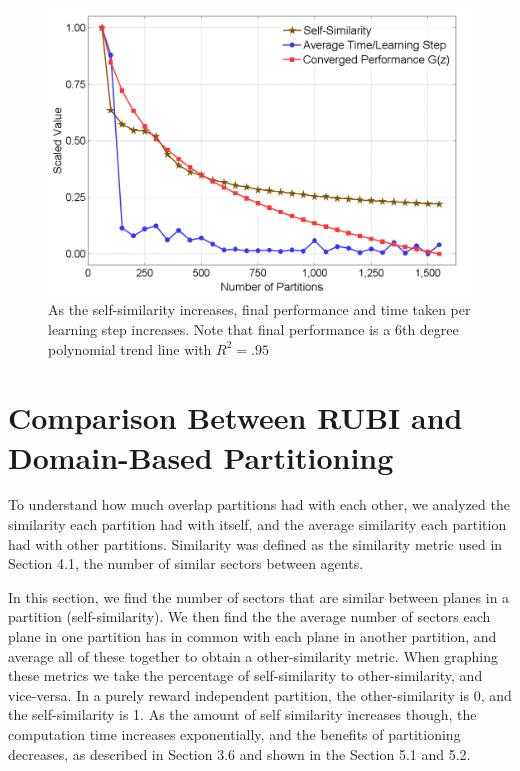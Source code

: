 \documentclass[onehalf,11pt]{beavtex}
\begin{document}

\begin{figure}
\centering
\includegraphics[width=1.0\columnwidth]{NewPartitionComparisons}
\caption{As the self-similarity increases, final performance and time taken per learning step increases. Note that final performance is a 6th degree polynomial trend line with $R^2 = .95$}
\label{NewPartitionComparisons}
\end{figure}


\section{Comparison Between RUBI and Domain-Based Partitioning}

To understand how much overlap partitions had with each other, we analyzed the similarity each partition had with itself, and the average similarity each partition had with other partitions. Similarity was defined as the similarity metric used in Section 4.1, the number of similar sectors between agents.

In this section, we find the number of sectors that are similar between planes in a partition (self-similarity). We then find the the average number of sectors each plane in one partition has in common with each plane in another partition, and average all of these together to obtain a other-similarity metric. When graphing these metrics we take the percentage of self-similarity to other-similarity, and vice-versa. In a purely reward independent partition, the other-similarity is 0, and the self-similarity is 1. As the amount of self similarity increases though, the computation time increases exponentially, and the benefits of partitioning decreases, as described in Section 3.6 and shown in the Section 5.1 and 5.2. 
\end{document}
